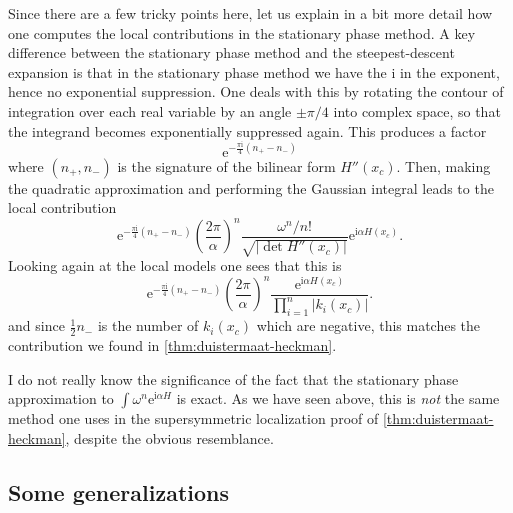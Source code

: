 \documentclass[12pt,letterpaper,reqno]{article}
\numberwithin{equation}{section}
\newcommand{\half}{\ensuremath{\frac{1}{2}}}
\newcommand{\I}{{\mathrm i}}
\newcommand{\e}{{\mathrm e}}
\newcommand{\abs}[1]{\lvert#1\rvert}
\newcommand{\ti}[1]{\textit{#1}}
\begin{document}
Since there are a few tricky points here, let us explain 
in a bit more detail how one computes the local contributions 
in the stationary phase method.
A key difference between the stationary phase method and
the steepest-descent expansion is that in the stationary phase 
method we have the
$\I$ in the exponent, hence no exponential suppression. 
One deals with this by rotating the contour of
integration over each real variable by an angle $\pm \pi/4$
into complex space, so that the integrand
becomes exponentially suppressed again.
This produces a factor
\begin{equation}
  \e^{-\frac{\pi \I}{4} (n_+ - n_-)}
\end{equation}
where $(n_+,n_-)$ is the signature of 
the bilinear form $H''(x_c)$.
Then, making the quadratic approximation and performing the Gaussian integral 
leads to the local contribution
\begin{equation}
  \e^{-\frac{\pi \I}{4} (n_+ - n_-)} \left( \frac{2 \pi}{\alpha} \right)^n
\frac{\omega^n/n!}{\sqrt{\abs{\det H''(x_c)}}} \e^{\I \alpha H(x_c)}.
\end{equation}
Looking again at the local models one sees that this is
\begin{equation}
  \e^{-\frac{\pi \I}{4} (n_+ - n_-)} \left( \frac{2 \pi}{\alpha} \right)^n
\frac{\e^{\I \alpha H(x_c)}}{\prod_{i=1}^n \abs{k_i(x_c)}}.
\end{equation}
and since $\half n_-$ is the number of $k_i(x_c)$ which are negative, this
matches the contribution we found in \autoref{thm:duistermaat-heckman}.

I do not really know the significance of the fact that 
the stationary phase
approximation to $\int \omega^n \e^{\I \alpha H}$ 
is exact. As we have seen above, this is \ti{not}
the same method one uses in the supersymmetric localization proof
of \autoref{thm:duistermaat-heckman}, despite the obvious resemblance.


\subsection{Some generalizations}
\end{document}
